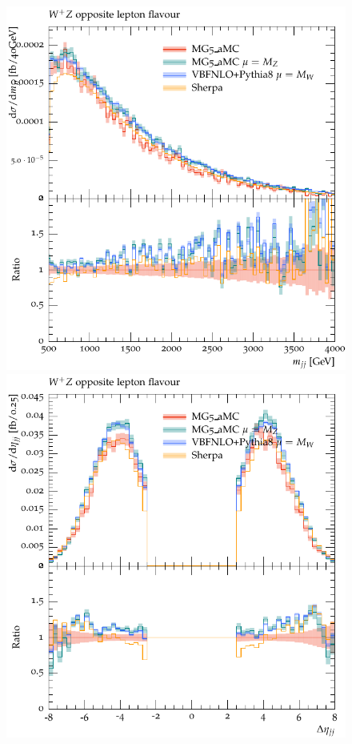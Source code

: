 \documentclass[11pt]{cernrep}
\begin{document}
\begin{figure}[htbp]
\begin{center}
   \includegraphics[scale=0.5]{figs/WpZ_OF_mjj}
   \includegraphics[scale=0.5]{figs/WpZ_OF_dEtajj}

\end{center}
\end{figure}
\end{document}
